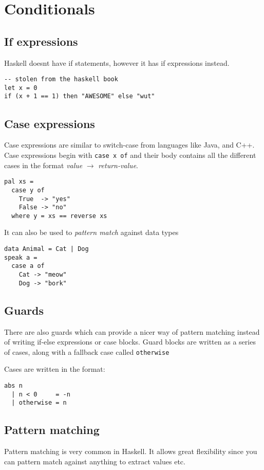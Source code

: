 \section{Conditionals}
\subsection{If expressions}
Haskell doesnt have if statements, however it has if expressions instead.

\begin{lstlisting}
-- stolen from the haskell book
let x = 0
if (x + 1 == 1) then "AWESOME" else "wut"
\end{lstlisting}

\subsection{Case expressions}
Case expressions are similar to switch-case from languages like Java, and C++. Case expressions begin with \texttt{case x of} and their body contains all the different
cases in the format \emph{value} $\rightarrow$ \emph{return-value}.

\begin{lstlisting}
pal xs =
  case y of
    True  -> "yes"
    False -> "no"
  where y = xs == reverse xs
\end{lstlisting}

It can also be used to \emph{pattern match} against data types
\begin{lstlisting}
data Animal = Cat | Dog
speak a =
  case a of
    Cat -> "meow"
    Dog -> "bork"
\end{lstlisting}

\newpage
\subsection{Guards}
There are also guards which can provide a nicer way of pattern matching instead of writing if-else expressions or case blocks. Guard blocks are written as a series of
cases, along with a fallback case called \texttt{otherwise}

Cases are written in the format:

\begin{lstlisting}
abs n
  | n < 0     = -n
  | otherwise = n
\end{lstlisting}


\subsection{Pattern matching}
Pattern matching is very common in Haskell. It allows great flexibility since you can pattern match against anything to extract values etc.

